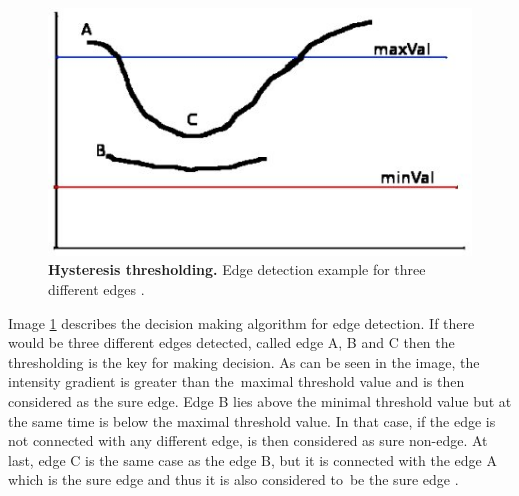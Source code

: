 \begin{figure}[!ht]
    \centering
    \includegraphics[width=.5\textwidth]{obrazky-figures/hysteresis.jpg}
    \caption{\textbf{Hysteresis thresholding.} Edge detection example for three different edges \cite{canny-opencv}.}
    \label{hysteresis}
\end{figure}

Image \ref{hysteresis} describes the decision making algorithm for edge detection. If there would be three different edges detected, called edge A, B and C then the thresholding is the key for making decision. As can be seen in the image, the intensity gradient is greater than the~maximal threshold value and is then considered as the sure edge. Edge B lies above the minimal threshold value but at the same time is below the maximal threshold value. In that case, if the edge is not connected with any different edge, is then considered as sure non-edge. At last, edge C is the same case as the edge B, but it is connected with the edge A which is the sure edge and thus it is also considered to~be the sure edge \cite{canny-opencv}.

